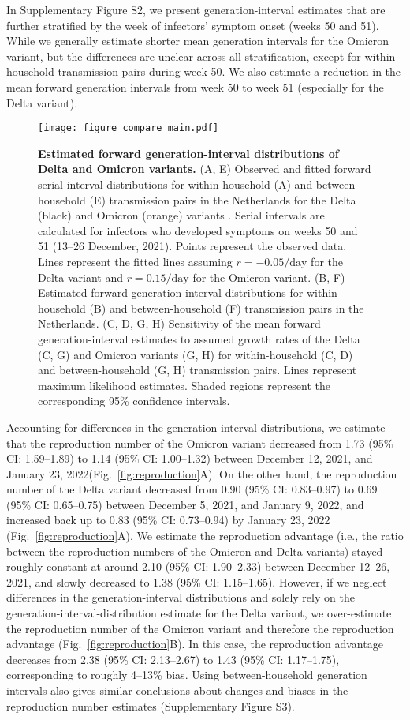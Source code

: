 \documentclass[12pt]{article}
\newcommand{\fref}[1]{Fig.~\ref{fig:#1}}
\begin{document}
In Supplementary Figure S2, we present generation-interval estimates that are further stratified by the week of infectors' symptom onset (weeks 50 and 51).
While we generally estimate shorter mean generation intervals for the Omicron variant, but the differences are unclear across all stratification, except for within-household transmission pairs during week 50.
We also estimate a reduction in the mean forward generation intervals from week 50 to week 51 (especially for the Delta variant). 

\begin{figure}[!th]
\texttt{[image: figure\_compare\_main.pdf]}
\caption{
\textbf{Estimated forward generation-interval distributions of Delta and Omicron variants.}
(A, E) Observed and fitted forward serial-interval distributions for within-household (A) and between-household (E) transmission pairs in the Netherlands for the Delta (black) and Omicron (orange) variants \citep{backer2021omicron}.
Serial intervals are calculated for infectors who developed symptoms on weeks 50 and 51 (13--26 December, 2021).
Points represent the observed data.
Lines represent the fitted lines assuming $r=-0.05/\textrm{day}$ for the Delta variant and $r=0.15/\textrm{day}$ for the Omicron variant.
(B, F) Estimated forward generation-interval distributions for within-household (B) and between-household (F) transmission pairs in the Netherlands.
(C, D, G, H) Sensitivity of the mean forward generation-interval estimates to assumed growth rates of the Delta (C, G) and Omicron variants (G, H) for within-household (C, D) and between-household (G, H) transmission pairs.
Lines represent maximum likelihood estimates.
Shaded regions represent the corresponding 95\% confidence intervals.
\label{fig:serial}
}
\end{figure}

Accounting for differences in the generation-interval distributions, we estimate that the reproduction number of the Omicron variant decreased from 1.73 (95\% CI: 1.59--1.89) to 1.14 (95\% CI: 1.00--1.32) between December 12, 2021, and January 23, 2022(\fref{reproduction}A).
On the other hand, the reproduction number of the Delta variant decreased from 0.90 (95\% CI: 0.83--0.97) to 0.69 (95\% CI: 0.65--0.75) between December 5, 2021, and January 9, 2022, and increased back up to 0.83 (95\% CI: 0.73--0.94) by January 23, 2022 (\fref{reproduction}A).
We estimate the reproduction advantage (i.e., the ratio between the reproduction numbers of the Omicron and Delta variants) stayed roughly constant at around 2.10 (95\% CI: 1.90--2.33) between December 12--26, 2021, and slowly decreased to 1.38 (95\% CI: 1.15--1.65).
However, if we neglect differences in the generation-interval distributions and solely rely on the generation-interval-distribution estimate for the Delta variant, we over-estimate the reproduction number of the Omicron variant and therefore the reproduction advantage (\fref{reproduction}B).
In this case, the reproduction advantage decreases from 2.38 (95\% CI: 2.13--2.67) to 1.43 (95\% CI: 1.17--1.75), corresponding to roughly 4--13\% bias.
Using between-household generation intervals also gives similar conclusions about changes and biases in the reproduction number estimates (Supplementary Figure S3).
\end{document}
